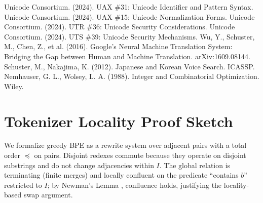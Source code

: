 \documentclass{article}
\begin{document}
\begin{thebibliography}{99}
Unicode Consortium. (2024). UAX \#31: Unicode Identifier and Pattern Syntax.
Unicode Consortium. (2024). UAX \#15: Unicode Normalization Forms.
Unicode Consortium. (2024). UTR \#36: Unicode Security Considerations.
Unicode Consortium. (2024). UTS \#39: Unicode Security Mechanisms.
Wu, Y., Schuster, M., Chen, Z., et al. (2016). Google's Neural Machine Translation System: Bridging the Gap between Human and Machine Translation. arXiv:1609.08144.
Schuster, M., Nakajima, K. (2012). Japanese and Korean Voice Search. ICASSP.
Nemhauser, G. L., Wolsey, L. A. (1988). Integer and Combinatorial Optimization. Wiley.
\end{thebibliography}

\appendix
\section{Tokenizer Locality Proof Sketch}\label{app:locality}
We formalize greedy BPE as a rewrite system over adjacent pairs with a total order $\preceq$ on pairs. Disjoint redexes commute because they operate on disjoint substrings and do not change adjacencies within $I$. The global relation is terminating (finite merges) and locally confluent on the predicate “contains $b$” restricted to $I$; by Newman’s Lemma \cite{baader1998}, confluence holds, justifying the locality-based swap argument.
\end{document}
